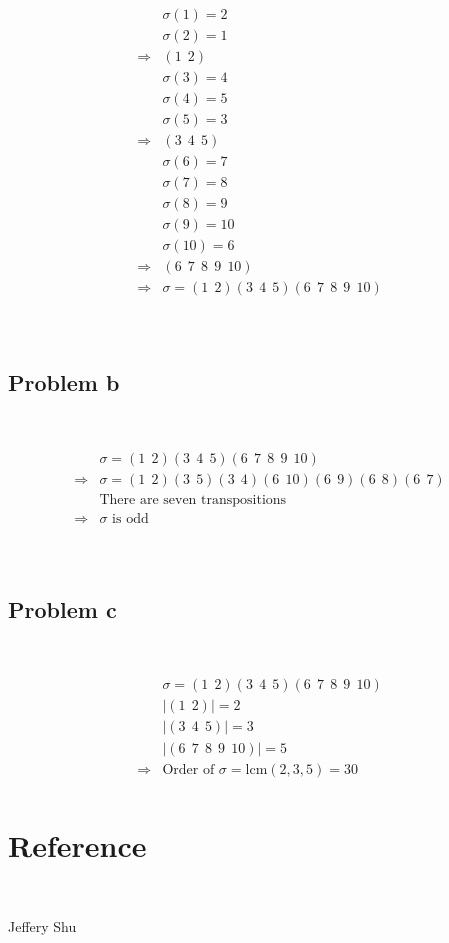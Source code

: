 \documentclass{article}
\begin{document}
\begin{equation*}
    \begin{split}
        &\sigma(1)=2\\
        &\sigma(2)=1\\
        \Rightarrow&(1\ \  2)\\
        &\sigma(3)=4\\
        &\sigma(4)=5\\
        &\sigma(5)=3\\
        \Rightarrow&(3\ \ 4\ \ 5)\\
        &\sigma(6)=7\\
        &\sigma(7)=8\\
        &\sigma(8)=9\\
        &\sigma(9)=10\\
        &\sigma(10)=6\\
        \Rightarrow&(6\ \ 7\ \ 8\ \ 9 \ \ 10)\\
        \Rightarrow&\sigma=(1\ \  2)(3\ \ 4\ \ 5)(6\ \ 7\ \ 8\ \ 9 \ \ 10)\\
    \end{split}
\end{equation*}

~

\subsection*{Problem b}

~

\begin{equation*}
    \begin{split}
        &\sigma=(1\ \  2)(3\ \ 4\ \ 5)(6\ \ 7\ \ 8\ \ 9 \ \ 10)\\
        \Rightarrow&\sigma=(1\ \  2)(3\ \ 5)(3\ \ 4)(6\ \ 10)(6\ \ 9)(6\ \ 8)(6 \ \ 7)\\
        &\text{There are seven transpositions}\\
        \Rightarrow&\sigma\text{ is odd}\\
    \end{split}
\end{equation*}

~

\subsection*{Problem c}

~

\begin{equation*}
    \begin{split}
        &\sigma=(1\ \  2)(3\ \ 4\ \ 5)(6\ \ 7\ \ 8\ \ 9 \ \ 10)\\
        &|(1\ \  2)|=2\\
        &|(3\ \ 4\ \ 5)|=3\\
        &|(6\ \ 7\ \ 8\ \ 9 \ \ 10)|=5\\
        \Rightarrow&\text{Order of }\sigma=\mathrm{lcm}(2,3,5)=30\\
    \end{split}
\end{equation*}

\newpage

\section*{Reference}

~

Jeffery Shu
\end{document}
